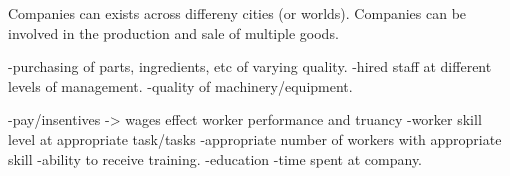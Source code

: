 

Companies can exists across differeny cities (or worlds).
Companies can be involved in the production and sale of multiple goods.




-purchasing of parts, ingredients, etc of varying quality.
-hired staff at different levels of management.
-quality of machinery/equipment.


-pay/insentives -> wages effect worker performance and truancy
-worker skill level at appropriate task/tasks
-appropriate number of workers with appropriate skill
-ability to receive training.
-education
-time spent at company.






